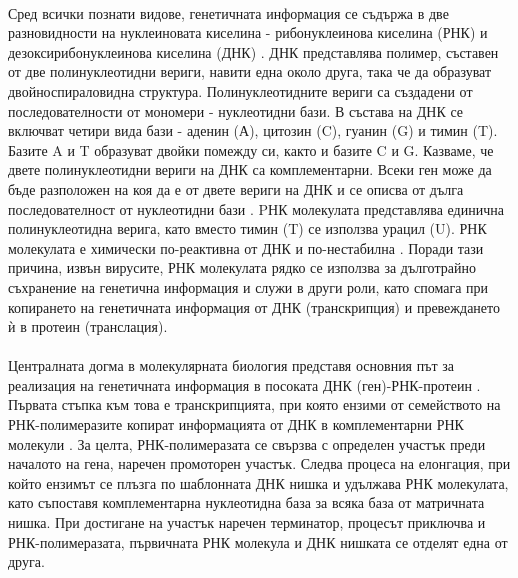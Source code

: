 \documentclass[pdftex,cyrillic,14pt,a4page,twoside,openright]{extreport}
\begin{document}
\paragraph{}
Сред всички познати видове, генетичната информация се съдържа в две разновидности на нуклеиновата киселина - рибонуклеинова киселина (РНК) и дезоксирибонуклеинова киселина (ДНК) \cite{houlihan2017}. ДНК представлява полимер, съставен от две полинуклеотидни вериги, навити една около друга, така че да образуват двойноспираловидна структура. Полинуклеотидните вериги са създадени от последователности от мономери - нуклеотидни бази. В състава на ДНК се включват четири вида бази - аденин (А), цитозин (C), гуанин (G) и тимин (T). Базите A и T образуват двойки помежду си, както и базите C и G. Казваме, че двете полинуклеотидни вериги на ДНК са комплементарни. Всеки ген може да бъде разположен на коя да е от двете вериги на ДНК и се описва от дълга последователност от нуклеотидни бази \cite{klug2014dna}. PНК молекулата представлява единична полинуклеотидна верига, като вместо тимин (T) се използва урацил (U). РНК молекулата е химически по-реактивна от ДНК и по-нестабилна \cite{soukup1999, cristescu2019}. Поради тази причина, извън вирусите, РНК молекулата рядко се използва за дълготрайно съхранение на генетична информация и служи в други роли, като спомага при копирането на генетичната информация от ДНК (транскрипция) и превеждането ѝ в протеин (транслация).

\paragraph{}
Централната догма в молекулярната биология представя основния път за реализация на генетичната информация в посоката ДНК (ген)-РНК-протеин \cite{crick1970central}. Първата стъпка към това е транскрипцията, при която ензими от семейството на РНК-полимеразите копират информацията от ДНК в комплементарни РНК молекули \cite{sims2004}. За целта, РНК-полимеразата се свързва с определен участък преди началото на гена, наречен промоторен участък. Следва процеса на елонгация, при който ензимът се плъзга по шаблонната ДНК нишка и удължава РНК молекулата, като съпоставя комплементарна нуклеотидна база за всяка база от матричната нишка. При достигане на участък наречен терминатор, процесът приключва и РНК-полимеразата, първичната РНК молекула и ДНК нишката се отделят една от друга.
\end{document}
